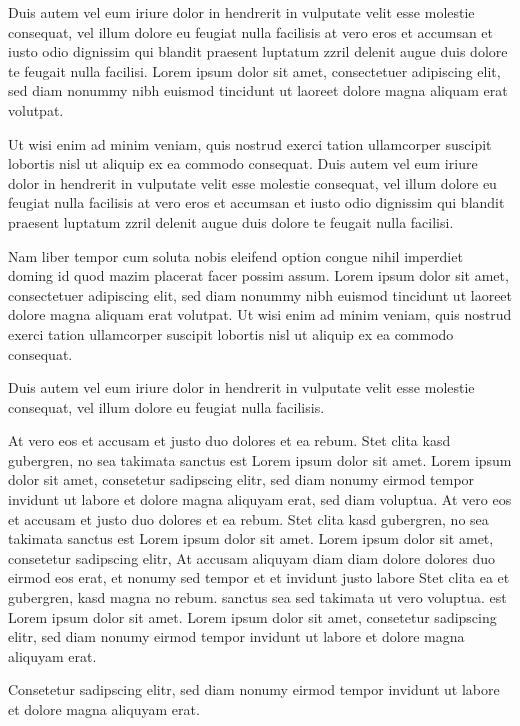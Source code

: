 \documentclass[]{../metanetpaper}
\begin{document}
\begin{Parallel}[c]{80mm}{80mm}
{    Duis autem vel eum iriure dolor in hendrerit in vulputate velit esse molestie consequat, vel illum dolore eu feugiat nulla facilisis at vero eros et accumsan et iusto odio dignissim qui blandit praesent luptatum zzril delenit augue duis dolore te feugait nulla facilisi. Lorem ipsum dolor sit amet, consectetuer adipiscing elit, sed diam nonummy nibh euismod tincidunt ut laoreet dolore magna aliquam erat volutpat.   

    Ut wisi enim ad minim veniam, quis nostrud exerci tation ullamcorper suscipit lobortis nisl ut aliquip ex ea commodo consequat. Duis autem vel eum iriure dolor in hendrerit in vulputate velit esse molestie consequat, vel illum dolore eu feugiat nulla facilisis at vero eros et accumsan et iusto odio dignissim qui blandit praesent luptatum zzril delenit augue duis dolore te feugait nulla facilisi.   

    Nam liber tempor cum soluta nobis eleifend option congue nihil imperdiet doming id quod mazim placerat facer possim assum. Lorem ipsum dolor sit amet, consectetuer adipiscing elit, sed diam nonummy nibh euismod tincidunt ut laoreet dolore magna aliquam erat volutpat. Ut wisi enim ad minim veniam, quis nostrud exerci tation ullamcorper suscipit lobortis nisl ut aliquip ex ea commodo consequat.   

    Duis autem vel eum iriure dolor in hendrerit in vulputate velit esse molestie consequat, vel illum dolore eu feugiat nulla facilisis.   

    At vero eos et accusam et justo duo dolores et ea rebum. Stet clita kasd gubergren, no sea takimata sanctus est Lorem ipsum dolor sit amet. Lorem ipsum dolor sit amet, consetetur sadipscing elitr, sed diam nonumy eirmod tempor invidunt ut labore et dolore magna aliquyam erat, sed diam voluptua. At vero eos et accusam et justo duo dolores et ea rebum. Stet clita kasd gubergren, no sea takimata sanctus est Lorem ipsum dolor sit amet. Lorem ipsum dolor sit amet, consetetur sadipscing elitr, At accusam aliquyam diam diam dolore dolores duo eirmod eos erat, et nonumy sed tempor et et invidunt justo labore Stet clita ea et gubergren, kasd magna no rebum. sanctus sea sed takimata ut vero voluptua. est Lorem ipsum dolor sit amet. Lorem ipsum dolor sit amet, consetetur sadipscing elitr, sed diam nonumy eirmod tempor invidunt ut labore et dolore magna aliquyam erat.   

    Consetetur sadipscing elitr, sed diam nonumy eirmod tempor invidunt ut labore et dolore magna aliquyam erat.
  }


\end{Parallel}
\end{document}
